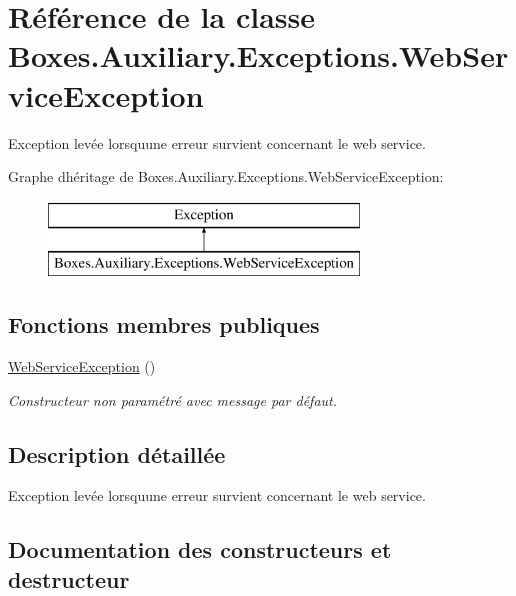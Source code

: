 \hypertarget{class_boxes_1_1_auxiliary_1_1_exceptions_1_1_web_service_exception}{}\section{Référence de la classe Boxes.\+Auxiliary.\+Exceptions.\+Web\+Service\+Exception}
\label{class_boxes_1_1_auxiliary_1_1_exceptions_1_1_web_service_exception}


Exception levée lorsqu\textquotesingle{}une erreur survient concernant le web service.  


Graphe d\textquotesingle{}héritage de Boxes.\+Auxiliary.\+Exceptions.\+Web\+Service\+Exception\+:\begin{figure}[H]
\begin{center}
\leavevmode
\includegraphics[height=2.000000cm]{class_boxes_1_1_auxiliary_1_1_exceptions_1_1_web_service_exception}
\end{center}
\end{figure}
\subsection*{Fonctions membres publiques}
\begin{DoxyCompactItemize}
\item 
\hyperlink{class_boxes_1_1_auxiliary_1_1_exceptions_1_1_web_service_exception_ab1b87f1123eeff2a7d2ddfd49f9868fb}{Web\+Service\+Exception} ()
\begin{DoxyCompactList}\small\item\em Constructeur non paramétré avec message par défaut. \end{DoxyCompactList}\end{DoxyCompactItemize}


\subsection{Description détaillée}
Exception levée lorsqu\textquotesingle{}une erreur survient concernant le web service. 



\subsection{Documentation des constructeurs et destructeur}
